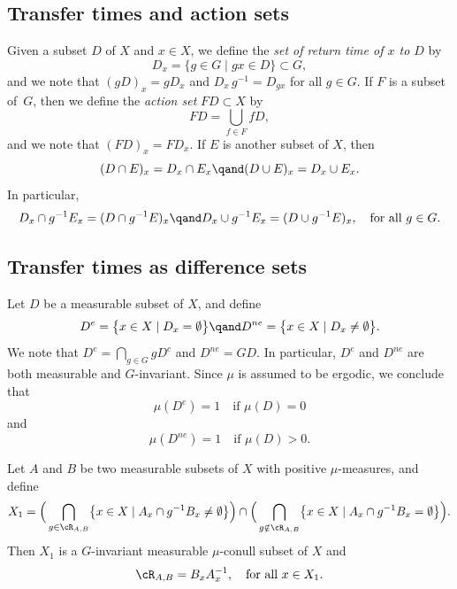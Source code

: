 \subsection{Transfer times and action sets}
\label{subsec:deftransfer}
Given a subset $D$ of $X$ and $x \in X$, we define the \emph{set of return time of $x$ to $D$} by
\[
D_x = \bigl\{ g \in G \mid  gx \in D \bigr\} \subset G,
\]
and we note that $(gD)_x = gD_x$ and $D_x \, g^{-1} = D_{gx}$ for all $g \in G$.
If $F$ is a subset of~$G$, then we define the \emph{action set} $FD \subset X$ by
\[
FD = \bigcup_{f \in F} fD,
\]
and we note that $(FD)_x = F D_x$. If $E$ is another subset of $X$, then
\[
(D \cap E)_x = D_x \cap E_x \qand (D \cup E)_x = D_x \cup E_x.
\]
In particular,
\begin{equation}
\label{eq_DcapE}
D_x \cap g^{-1} E_x = (D \cap g^{-1} E)_x \qand D_x \cup g^{-1} E_x = (D \cup g^{-1} E)_x, \quad \textrm{for all $g \in G$}.
\end{equation}

\subsection{Transfer times as difference sets}

Let $D$ be a measurable subset of $X$, and define
\[
D^{e} = \bigl\{ x \in X \mid  D_x = \emptyset \bigr\}
\qand
D^{ne} = \bigl\{ x \in X \mid  D_x \neq \emptyset \bigr\}.
\]
We note that $D^{e} = \bigcap_{g \in G} gD^c$ and $D^{ne} = GD$. In particular, $D^e$ and $D^{ne}$ are both measurable and $G$-invariant.
Since $\mu$ is assumed to be ergodic, we conclude that
\begin{equation}
\label{De}
\mu(D^e) = 1 \quad \textrm{if $\mu(D) = 0$}
\end{equation}
and
\begin{equation}
\label{Dne}
\mu(D^{ne}) = 1 \quad \textrm{if $\mu(D) > 0$}.
\end{equation}

\begin{lemma}
\label{lemma_passtoreturns}
Let $A$ and $B$ be two measurable subsets of $X$ with positive $\mu$-measures, and define
\[
X_1 = \Big( \bigcap_{g \in \cR_{A,B}} \bigl\{ x \in X \mid  A_x \cap g^{-1}B_x \neq \emptyset \bigr\} \Big)
\cap
\Big( \bigcap_{g \notin \cR_{A,B}} \bigl\{ x \in X \mid  A_x \cap g^{-1} B_x = \emptyset \bigr\} \Big).
\]
Then $X_1$ is a $G$-invariant measurable $\mu$-conull subset of $X$ and
\[
\cR_{A,B} = B_x A_x^{-1}, \quad \textrm{for all $x \in X_1$}.
\]
\end{lemma}

